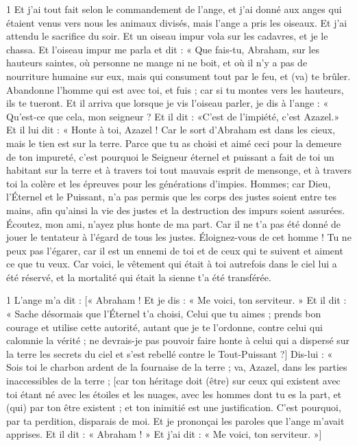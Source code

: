\par 1 Et j'ai tout fait selon le commandement de l'ange, et j'ai donné aux anges qui étaient venus vers nous les animaux divisés, mais l'ange a pris les oiseaux. Et j'ai attendu le sacrifice du soir. Et un oiseau impur vola sur les cadavres, et je le chassa. Et l'oiseau impur me parla et dit : « Que fais-tu, Abraham, sur les hauteurs saintes, où personne ne mange ni ne boit, et où il n'y a pas de nourriture humaine sur eux, mais qui consument tout par le feu, et (va) te brûler. Abandonne l'homme qui est avec toi, et fuis ; car si tu montes vers les hauteurs, ils te tueront. Et il arriva que lorsque je vis l'oiseau parler, je dis à l'ange : « Qu'est-ce que cela, mon seigneur ? Et il dit : «C'est de l'impiété, c'est Azazel.» Et il lui dit : « Honte à toi, Azazel ! Car le sort d'Abraham est dans les cieux, mais le tien est sur la terre. Parce que tu as choisi et aimé ceci pour la demeure de ton impureté, c'est pourquoi le Seigneur éternel et puissant a fait de toi un habitant sur la terre et à travers toi tout mauvais esprit de mensonge, et à travers toi la colère et les épreuves pour les générations d'impies. Hommes; car Dieu, l'Éternel et le Puissant, n'a pas permis que les corps des justes soient entre tes mains, afin qu'ainsi la vie des justes et la destruction des impurs soient assurées. Écoutez, mon ami, n'ayez plus honte de ma part. Car il ne t'a pas été donné de jouer le tentateur à l'égard de tous les justes. Éloignez-vous de cet homme ! Tu ne peux pas l'égarer, car il est un ennemi de toi et de ceux qui te suivent et aiment ce que tu veux. Car voici, le vêtement qui était à toi autrefois dans le ciel lui a été réservé, et la mortalité qui était la sienne t'a été transférée.


\par 1 L'ange m'a dit : [« Abraham ! Et je dis : « Me voici, ton serviteur. » Et il dit : « Sache désormais que l'Éternel t'a choisi, Celui que tu aimes ; prends bon courage et utilise cette autorité, autant que je te l'ordonne, contre celui qui calomnie la vérité ; ne devrais-je pas pouvoir faire honte à celui qui a dispersé sur la terre les secrets du ciel et s'est rebellé contre le Tout-Puissant ?] Dis-lui : « Sois toi le charbon ardent de la fournaise de la terre ; va, Azazel, dans les parties inaccessibles de la terre ; [car ton héritage doit (être) sur ceux qui existent avec toi étant né avec les étoiles et les nuages, avec les hommes dont tu es la part, et (qui) par ton être existent ; et ton inimitié est une justification. C'est pourquoi, par ta perdition, disparais de moi. Et je prononçai les paroles que l'ange m'avait apprises. Et il dit : « Abraham ! » Et j’ai dit : « Me voici, ton serviteur. »]

